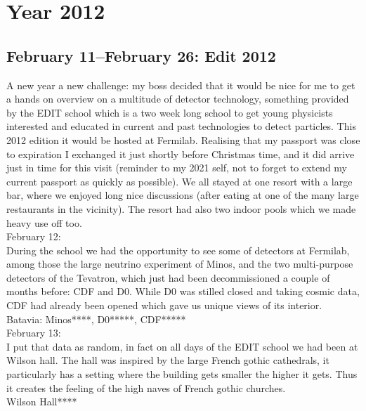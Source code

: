 \chapter{Year 2012}
\label{2012}

\section{February 11--February 26: Edit 2012}
\label{2012:EDIT}

A new year a new challenge: my boss decided that it would be nice for me to get a hands on overview on a multitude of detector technology, something provided by the EDIT school which is a two week long school to get young physicists interested and educated in current and past technologies to detect particles. This 2012 edition it would be hosted at Fermilab. Realising that my passport was close to expiration I exchanged it just shortly before Christmas time, and it did arrive just in time for this visit (reminder to my 2021 self, not to forget to extend my current passport as quickly as possible). We all stayed at one resort with a large bar, where we enjoyed long nice discussions (after eating at one of the many large restaurants in the vicinity). The resort had also two indoor pools which we made heavy use off too.\\

February 12:\\
During the school we had the opportunity to see some of detectors at Fermilab, among those the large neutrino experiment of Minos, and the two multi-purpose detectors of the Tevatron, which just had been decommissioned a couple of months before: CDF and D0. While D0 was stilled closed and taking cosmic data, CDF had already been opened which gave us unique views of its interior.\\

Batavia: Minos****, D0*****, CDF*****\\

February 13:\\
I put that data as random, in fact on all days of the EDIT school we had been at Wilson hall. The hall was inspired by the large French gothic cathedrals, it particularly has a setting where the building gets smaller the higher it gets. Thus it creates the feeling of the high naves of French gothic churches.\\

Wilson Hall****\\

